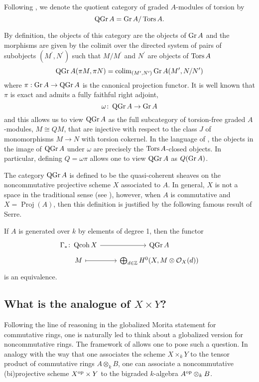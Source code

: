 \documentclass[reqno, 12pt]{amsart}
\begin{document}
\begin{definition}
  Following \cite{AZ}, we denote the quotient category of graded $A$-modules of torsion by
  $$\operatorname{QGr}A = \operatorname{Gr}A/\operatorname{Tors}A.$$
\end{definition}
By definition, the objects of this category are the objects of $\operatorname{Gr}A$ and the morphisms are given by the colimit over the directed system of pairs of subobjects $(M^\prime, N^\prime)$ such that $M/M^\prime$ and $N^\prime$ are objects of $\operatorname{Tors}A$
$$\operatorname{QGr}A(\pi M, \pi N) = \operatorname{colim}_{(M^\prime, N^\prime)} \operatorname{Gr}A(M^\prime, N/N^\prime)$$
where $\pi: \operatorname{Gr}A \to \operatorname{QGr}A$ is the canonical projection functor.
It is well known that $\pi$ is exact and admits a fully faithful right adjoint,
$$\omega \colon \operatorname{QGr}A \to \operatorname{Gr}A$$
and this allows us to view $\operatorname{QGr}A$ as the full subcategory of torsion-free graded $A$-modules, $M \cong QM$, that are injective with respect to the class $J$ of monomorphisms $M \to N$ with torsion cokernel.
In the language of \cite{DCA}, the objects in the image of $\operatorname{QGr}A$ under $\omega$ are precisely the $\operatorname{Tors}A$-closed objects.
In particular, defining $Q = \omega\pi$ allows one to view $\operatorname{QGr}A$ as $Q(\operatorname{Gr}A)$.

The category $\operatorname{QGr}A$ is defined to be the quasi-coherent sheaves on the noncommutative projective scheme $X$ associated to $A$.
In general, $X$ is not a space in the traditional sense (see \cite{AZ}), however, when $A$ is commutative and $X = \operatorname{Proj}(A)$, then this definition is justified by the following famous result of Serre.
\begin{theorem}[Serre]
  If $A$ is generated over $k$ by elements of degree 1, then the functor
  $$\begin{tikzcd}[row sep=tiny]
    \Gamma_\ast \colon \Qcoh{X} \arrow{r}& \QGr{A}\\
    M \arrow[mapsto]{r} & \bigoplus_{d \in \Z} H^0(X, M \otimes \mathcal{O}_X(d))
  \end{tikzcd}$$
  is an equivalence.
\end{theorem}

\subsection{What is the analogue of $X \times Y$?}
Following the line of reasoning in the globalized Morita statement for commutative rings, one is naturally led to think about a globalized version for noncommutative rings.
The framework of \cite{AZ} allows one to pose such a question.
In analogy with the way that one associates the scheme $X \times_k Y$ to the tensor product of commutative rings $A \otimes_k B$, one can associate a noncommutative (bi)projective scheme $X^{\operatorname{op}} \times Y$ to the bigraded $k$-algebra $A^{\operatorname{op}} \otimes_k B$.
\end{document}

